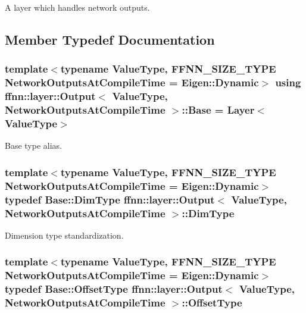 A layer which handles network outputs. 

\subsection{Member Typedef Documentation}
\hypertarget{classffnn_1_1layer_1_1_output_a76c3074490fd13bd2cdd86f53322da45}{
\subsubsection[{Base}]{\setlength{\rightskip}{0pt plus 5cm}template$<$typename Value\-Type, F\-F\-N\-N\-\_\-\-S\-I\-Z\-E\-\_\-\-T\-Y\-P\-E Network\-Outputs\-At\-Compile\-Time = Eigen\-::\-Dynamic$>$ using {\bf ffnn\-::layer\-::\-Output}$<$ Value\-Type, Network\-Outputs\-At\-Compile\-Time $>$\-::{\bf Base} =  {\bf Layer}$<$Value\-Type$>$}}\label{classffnn_1_1layer_1_1_output_a76c3074490fd13bd2cdd86f53322da45}


Base type alias. 

\hypertarget{classffnn_1_1layer_1_1_output_a1c45baba082c15f0a2f579a9b150cb9d}{
\subsubsection[{Dim\-Type}]{\setlength{\rightskip}{0pt plus 5cm}template$<$typename Value\-Type, F\-F\-N\-N\-\_\-\-S\-I\-Z\-E\-\_\-\-T\-Y\-P\-E Network\-Outputs\-At\-Compile\-Time = Eigen\-::\-Dynamic$>$ typedef {\bf Base\-::\-Dim\-Type} {\bf ffnn\-::layer\-::\-Output}$<$ Value\-Type, Network\-Outputs\-At\-Compile\-Time $>$\-::{\bf Dim\-Type}}}\label{classffnn_1_1layer_1_1_output_a1c45baba082c15f0a2f579a9b150cb9d}


Dimension type standardization. 

\hypertarget{classffnn_1_1layer_1_1_output_a6780ece144b80cb2be355dd65096e9db}{
\subsubsection[{Offset\-Type}]{\setlength{\rightskip}{0pt plus 5cm}template$<$typename Value\-Type, F\-F\-N\-N\-\_\-\-S\-I\-Z\-E\-\_\-\-T\-Y\-P\-E Network\-Outputs\-At\-Compile\-Time = Eigen\-::\-Dynamic$>$ typedef {\bf Base\-::\-Offset\-Type} {\bf ffnn\-::layer\-::\-Output}$<$ Value\-Type, Network\-Outputs\-At\-Compile\-Time $>$\-::{\bf Offset\-Type}}}\label{classffnn_1_1layer_1_1_output_a6780ece144b80cb2be355dd65096e9db}


